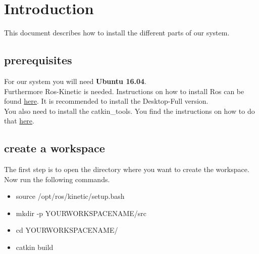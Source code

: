 \documentclass[main.tex]{subfiles}
\begin{document}
\newpage
	\section{Introduction}
	This document describes how to install the different parts of our system.
	
	\subsection{prerequisites}
	
	For our system you will need \textbf{Ubuntu 16.04}.\\
	Furthermore Ros-Kinetic is needed. Instructions on how to install Ros can be found \href{http://wiki.ros.org/kinetic/Installation/Ubuntu}{here}. It is recommended to install the Desktop-Full version.\\
	You also need to install the catkin\_tools. You find the instructions on how to do that \href{https://catkin-tools.readthedocs.io/en/latest/installing.html}{here}.\\
	\subsection{create a workspace}
	The first step is to open the directory where you want to create the workspace.\\
	Now run the following commands.
	\begin{itemize}
	\item source /opt/ros/kinetic/setup.bash
	\item mkdir -p YOURWORKSPACENAME/src
	\item cd YOURWORKSPACENAME/
	\item catkin build 
	\end{itemize}
	
\end{document}
